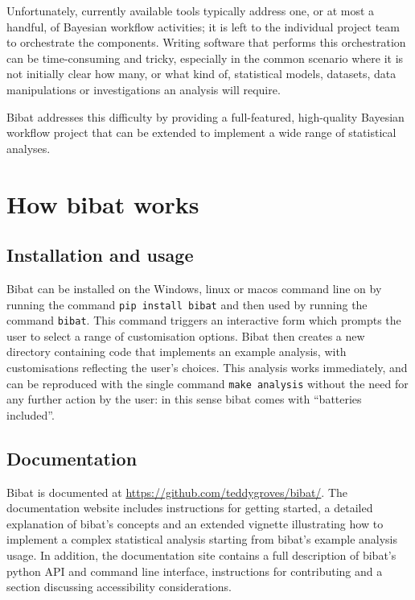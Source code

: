 \documentclass[sigconf, review]{acmart}
\begin{document}
Unfortunately, currently available tools typically address one, or at
most a handful, of Bayesian workflow activities; it is left to the
individual project team to orchestrate the components. Writing software
that performs this orchestration can be time-consuming and tricky,
especially in the common scenario where it is not initially clear how
many, or what kind of, statistical models, datasets, data manipulations
or investigations an analysis will require.

Bibat addresses this difficulty by providing a full-featured,
high-quality Bayesian workflow project that can be extended to implement
a wide range of statistical analyses.

\section{How bibat works}\label{how-bibat-works}

\subsection{Installation and usage}\label{installation-and-usage}

Bibat can be installed on the Windows, linux or macos command line on by
running the command \texttt{pip\ install\ bibat} and then used by
running the command \texttt{bibat}. This command triggers an interactive
form which prompts the user to select a range of customisation options.
Bibat then creates a new directory containing code that implements an
example analysis, with customisations reflecting the user's choices.
This analysis works immediately, and can be reproduced with the single
command \texttt{make\ analysis} without the need for any further action
by the user: in this sense bibat comes with ``batteries included''.

\subsection{Documentation}\label{documentation}

Bibat is documented at \url{https://github.com/teddygroves/bibat/}. The
documentation website includes instructions for getting started, a
detailed explanation of bibat's concepts and an extended vignette
illustrating how to implement a complex statistical analysis starting
from bibat's example analysis usage. In addition, the documentation site
contains a full description of bibat's python API and command line
interface, instructions for contributing and a section discussing
accessibility considerations.
\end{document}

